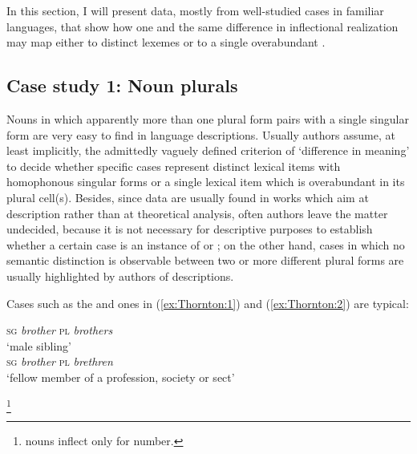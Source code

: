 \documentclass[output=paper]{langsci/langscibook}
\begin{document}
In this section, I will present data, mostly from well-studied cases in
familiar languages, that show how one and the same difference in
inflectional realization may map either to distinct lexemes or to a
single overabundant .

\subsection{Case study 1: Noun plurals}\label{case-study-1-noun-plurals}

Nouns in which apparently more than one plural form pairs with a single
singular form are very easy to find in language descriptions. Usually
authors assume, at least implicitly, the admittedly vaguely defined
criterion of `difference in meaning' to decide whether specific cases
represent distinct lexical items with homophonous singular forms or a
single lexical item which is overabundant in its plural cell(s).
Besides, since data are usually found in works which aim at description
rather than at theoretical analysis, often authors leave the matter
undecided, because it is not necessary for descriptive purposes to
establish whether a certain case is an instance of  or ;
on the other hand, cases in which no semantic distinction is observable
between two or more different plural forms are usually highlighted by
authors of descriptions.

\newpage
Cases such as the  and  ones in (\ref{ex:Thornton:1}) and (\ref{ex:Thornton:2}) are typical:

\ea\label{ex:Thornton:1}  %
\citep[347]{Aronoff2000b}%
%


\ea\label{ex:Thornton:1a}{\textsc{sg} \emph{brother} \textsc{pl} \emph{brothers}}\\
\glt `male sibling' \\

\ex\label{ex:Thornton:1b} \textsc{sg} \emph{brother} \textsc{pl} \emph{brethren}\\
\glt `fellow member of a profession, society or sect' \\

\z

\ex \label{ex:Thornton:2}  %
\citep{Trepos1980} %
%
\footnote{ nouns inflect only for number.}
\end{document}
